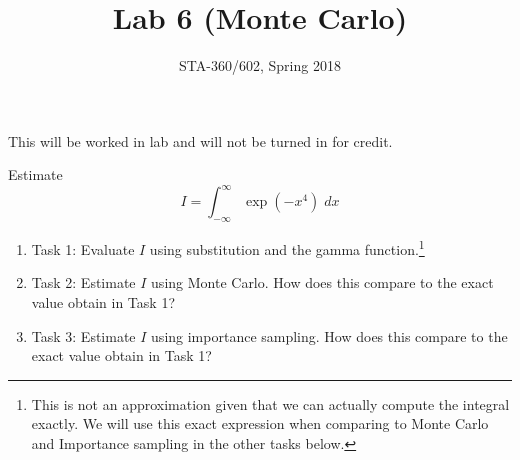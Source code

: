 \documentclass{article}
\begin{document}
\title{Lab 6 (Monte Carlo)}
\author{STA-360/602, Spring 2018}
\maketitle

This will be worked in lab and will not be turned in for credit. 


Estimate 
$$ I = \int_{-\infty}^{\infty} \exp(-x^4) \; dx$$ 




\begin{enumerate}
\item Task 1: Evaluate $I$ using substitution and the gamma
function.\footnote{This is not an approximation given that we can actually compute the integral exactly. We will use this exact expression when comparing to Monte Carlo and Importance sampling in the other tasks below.}
\item Task 2: Estimate $I$ using Monte Carlo. How does this compare to the exact value obtain in Task 1?
\item Task 3: Estimate $I$ using importance sampling. How does this compare to the exact value obtain in Task 1?
\end{enumerate}


%
%
%
%
%  
\end{document}
